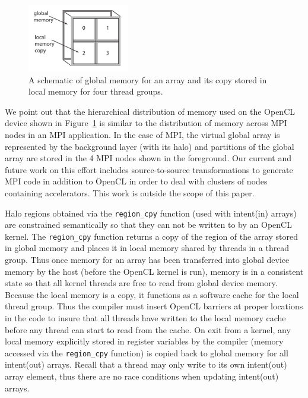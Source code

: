 \begin{figure}[!t]
\centering
\includegraphics[width=1.75in]{cl-memory.pdf}
\caption{A schematic of global memory for an array and its copy stored in local memory
for four thread groups.}
\label{fig:cl-memory}
\end{figure}

We point out that the hierarchical distribution of memory used on the
OpenCL device shown in Figure~\ref{fig:cl-memory} is similar to the
distribution of memory across MPI nodes in an MPI application.  In the
case of MPI, the virtual global array is represented by the background
layer (with its halo) and partitions of the global array are stored in
the 4 MPI nodes shown in the foreground.  Our current and future work
on this effort includes source-to-source transformations to generate
MPI code in addition to OpenCL in order to deal with clusters of nodes
containing accelerators.  This work is outside the scope of this
paper.

Halo regions obtained via the {\tt region\_cpy} function (used with
intent(in) arrays) are constrained semantically so that they can not
be written to by an OpenCL kernel.  The {\tt region\_cpy} function
returns a copy of the region of the array stored in global memory and
places it in local memory shared by threads in a thread group.  Thus
once memory for an array has been transferred into global device
memory by the host (before the OpenCL kernel is run), memory is in a
consistent state so that all kernel threads are free to read from
global device memory.  Because the local memory is a copy, it
functions as a software cache for the local thread group.  Thus the
compiler must insert OpenCL barriers at proper locations in the code
to insure that all threads have written to the local memory cache
before any thread can start to read from the cache.  On exit from a
kernel, any local memory explicitly stored in register variables by
the compiler (memory accessed via the {\tt region\_cpy} function) is
copied back to global memory for all intent(out) arrays.  Recall that
a thread may only write to its own intent(out) array element, thus
there are no race conditions when updating intent(out) arrays.

